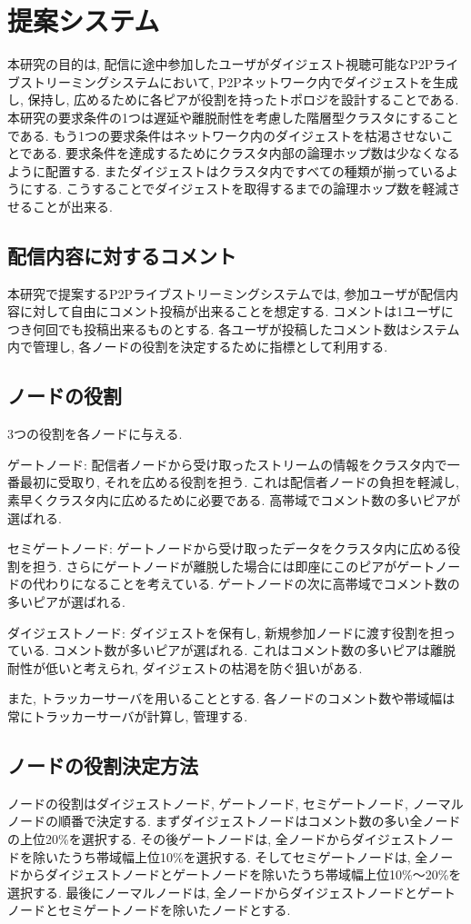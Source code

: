 \documentclass[letter]{ieicej}
\begin{document}
\newpage

\section{提案システム}
本研究の目的は, 配信に途中参加したユーザがダイジェスト視聴可能なP2Pライブストリーミングシステムにおいて, P2Pネットワーク内でダイジェストを生成し, 保持し, 広めるために各ピアが役割を持ったトポロジを設計することである. 本研究の要求条件の1つは遅延や離脱耐性を考慮した階層型クラスタにすることである. もう1つの要求条件はネットワーク内のダイジェストを枯渇させないことである. 要求条件を達成するためにクラスタ内部の論理ホップ数は少なくなるように配置する. またダイジェストはクラスタ内ですべての種類が揃っているようにする. こうすることでダイジェストを取得するまでの論理ホップ数を軽減させることが出来る.

\subsection{配信内容に対するコメント}
本研究で提案するP2Pライブストリーミングシステムでは, 参加ユーザが配信内容に対して自由にコメント投稿が出来ることを想定する. コメントは1ユーザにつき何回でも投稿出来るものとする. 各ユーザが投稿したコメント数はシステム内で管理し, 各ノードの役割を決定するために指標として利用する.

\subsection{ノードの役割}
3つの役割を各ノードに与える.

ゲートノード: 配信者ノードから受け取ったストリームの情報をクラスタ内で一番最初に受取り, それを広める役割を担う. これは配信者ノードの負担を軽減し, 素早くクラスタ内に広めるために必要である. 高帯域でコメント数の多いピアが選ばれる.

セミゲートノード: ゲートノードから受け取ったデータをクラスタ内に広める役割を担う. さらにゲートノードが離脱した場合には即座にこのピアがゲートノードの代わりになることを考えている. ゲートノードの次に高帯域でコメント数の多いピアが選ばれる.

ダイジェストノード: ダイジェストを保有し, 新規参加ノードに渡す役割を担っている. コメント数が多いピアが選ばれる. これはコメント数の多いピアは離脱耐性が低いと考えられ, ダイジェストの枯渇を防ぐ狙いがある.

また, トラッカーサーバを用いることとする. 各ノードのコメント数や帯域幅は常にトラッカーサーバが計算し, 管理する.

\subsection{ノードの役割決定方法}
ノードの役割はダイジェストノード, ゲートノード, セミゲートノード, ノーマルノードの順番で決定する. まずダイジェストノードはコメント数の多い全ノードの上位20\%を選択する. その後ゲートノードは, 全ノードからダイジェストノードを除いたうち帯域幅上位10\%を選択する. そしてセミゲートノードは, 全ノードからダイジェストノードとゲートノードを除いたうち帯域幅上位10\%〜20\%を選択する. 最後にノーマルノードは, 全ノードからダイジェストノードとゲートノードとセミゲートノードを除いたノードとする.
\end{document}
